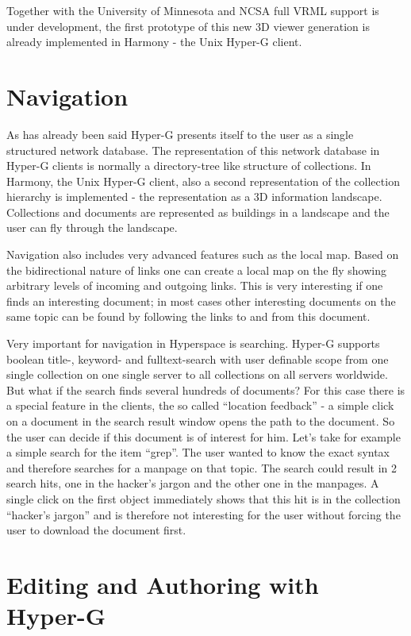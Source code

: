 Together with the University of Minnesota and NCSA full VRML support
is under development, the first prototype of this new 3D viewer
generation is already implemented in Harmony - the Unix Hyper-G
client.

\section{Navigation}

As has already been said Hyper-G presents itself to the user as a
single structured network database. The representation of this network
database in Hyper-G clients is normally a directory-tree like
structure of collections. In Harmony, the Unix Hyper-G client, also a
second representation of the collection hierarchy is implemented - the
representation as a 3D information landscape. Collections and
documents are represented as buildings in a landscape and the user can
fly through the landscape.

Navigation also includes very advanced features such as the local
map. Based on the bidirectional nature of links one can create a local
map on the fly showing arbitrary levels of incoming and outgoing
links. This is very interesting if one finds an interesting document;
in most cases other interesting documents on the same topic can be
found by following the links to and from this document.

Very important for navigation in Hyperspace is searching. Hyper-G
supports boolean title-, keyword- and fulltext-search with user
definable scope from one single collection on one single server to all
collections on all servers worldwide. But what if the search finds
several hundreds of documents? For this case there is a special
feature in the clients, the so called ``location feedback'' - a simple
click on a document in the search result window opens the path to the
document. So the user can decide if this document is of interest for
him. Let's take for example a simple search for the item ``grep''. The
user wanted to know the exact syntax and therefore searches for a
manpage on that topic. The search could result in 2 search hits, one
in the hacker's jargon and the other one in the manpages. A single
click on the first object immediately shows that this hit is in the
collection ``hacker's jargon'' and is therefore not interesting for
the user without forcing the user to download the document first.

\section{Editing and Authoring with Hyper-G}

